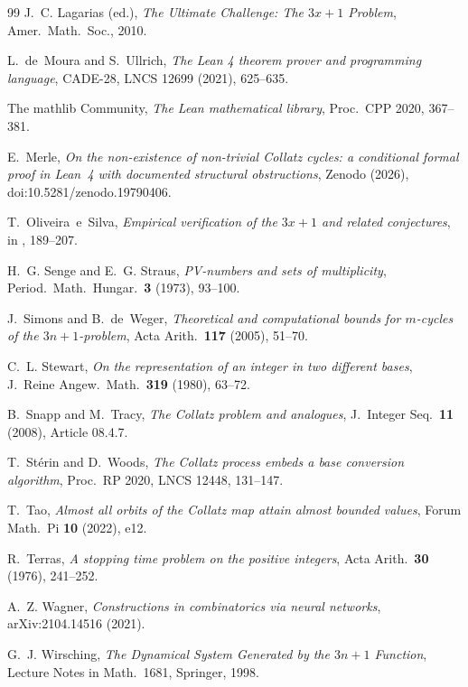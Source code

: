 \documentclass[11pt]{amsart}
\theoremstyle{definition}
\theoremstyle{remark}
\begin{document}
\begin{thebibliography}{99}
J.~C. Lagarias (ed.), \emph{The Ultimate Challenge: The $3x+1$ Problem},
Amer.\ Math.\ Soc., 2010.

L.~de~Moura and S.~Ullrich, \emph{The Lean 4 theorem prover and programming
language}, CADE-28, LNCS 12699 (2021), 625--635.

The mathlib Community, \emph{The Lean mathematical library},
Proc.\ CPP 2020, 367--381.

E.~Merle, \emph{On the non-existence of non-trivial Collatz cycles: a
conditional formal proof in Lean~4 with documented structural obstructions},
Zenodo (2026), doi:10.5281/zenodo.19790406.

T.~Oliveira~e~Silva, \emph{Empirical verification of the $3x+1$ and related
conjectures}, in \cite{Lagarias2010}, 189--207.

H.~G. Senge and E.~G. Straus, \emph{PV-numbers and sets of multiplicity},
Period.\ Math.\ Hungar.\ \textbf{3} (1973), 93--100.

J.~Simons and B.~de~Weger, \emph{Theoretical and computational bounds for
$m$-cycles of the $3n+1$-problem}, Acta Arith.\ \textbf{117} (2005),
51--70.

C.~L. Stewart, \emph{On the representation of an integer in two different
bases}, J.~Reine Angew.\ Math.\ \textbf{319} (1980), 63--72.

B.~Snapp and M.~Tracy, \emph{The Collatz problem and analogues},
J.~Integer Seq.\ \textbf{11} (2008), Article 08.4.7.

T.~Stérin and D.~Woods, \emph{The Collatz process embeds a base conversion
algorithm}, Proc.\ RP 2020, LNCS 12448, 131--147.

T.~Tao, \emph{Almost all orbits of the Collatz map attain almost bounded
values}, Forum Math.\ Pi \textbf{10} (2022), e12.

R.~Terras, \emph{A stopping time problem on the positive integers},
Acta Arith.\ \textbf{30} (1976), 241--252.

A.~Z. Wagner, \emph{Constructions in combinatorics via neural networks},
arXiv:2104.14516 (2021).

G.~J. Wirsching, \emph{The Dynamical System Generated by the $3n+1$
Function}, Lecture Notes in Math.\ 1681, Springer, 1998.

\end{thebibliography}
\end{document}
